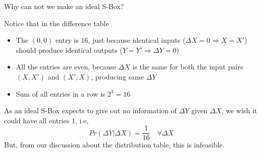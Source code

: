 \documentclass[9pt]{beamer}
\begin{document}
\begin{frame}
Why can not we make an ideal S-Box?

Notice that in the difference table
\begin{itemize}
\item{The $(0,0)$ entry is $16$, just because identical inputs ($\Delta X = 0 \Rightarrow X = X'$) should produce identical outputs ($Y = Y' \Rightarrow \Delta Y = 0$)}
\item{All the entries are even, because $\Delta X$ is the same for both the input pairs $(X,X')$ and $(X',X)$, producing same $\Delta Y$}
\item{Sum of all entries in a row is $2^4 = 16$}
\end{itemize}

As an ideal S-Box expects to give out no information of $\Delta Y$ given $\Delta X$, we wish it could have all entries $1$, i.e,
\[ Pr(\Delta Y | \Delta X) = \frac{1}{16} \quad \forall \Delta X  \]
But, from our discussion about the distribution table, this is infeasible.
\end{frame}
\end{document}
